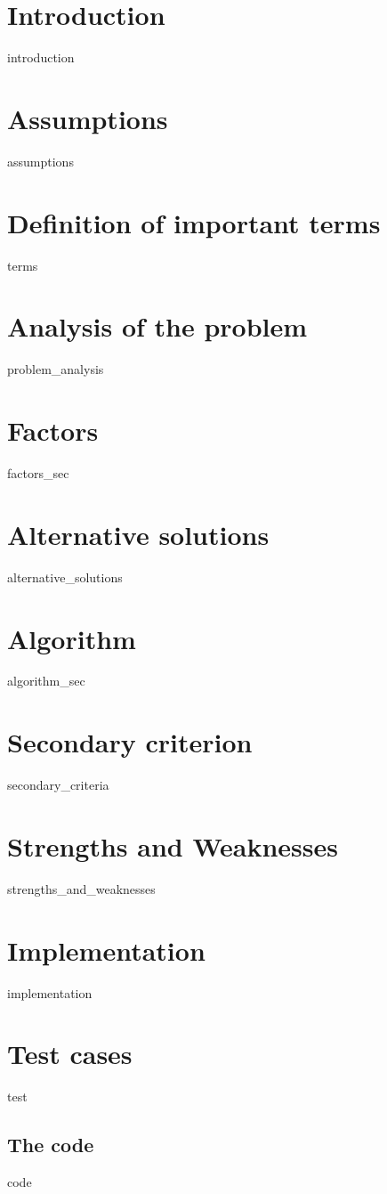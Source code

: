 \section{Introduction}
{introduction}

\section{Assumptions}
{assumptions}

\section{Definition of important terms}
\begin{labeling}{\hspace{3cm}}
{terms}
\end{labeling}

\section{Analysis of the problem}
{problem_analysis}

\section{Factors}
{factors_sec}

\section{Alternative solutions}
{alternative_solutions}

\section{Algorithm}
{algorithm_sec}

\section{Secondary criterion}
{secondary_criteria}

\section{Strengths and Weaknesses}
{strengths_and_weaknesses}

\section{Implementation}
{implementation}

\section{Test cases}
{test}

\clearpage
{}
\printbibliography[heading=bibintoc]

\clearpage
\begin{appendices}

\section{The code} \label{appendix:code}
{code}

\end{appendices}

